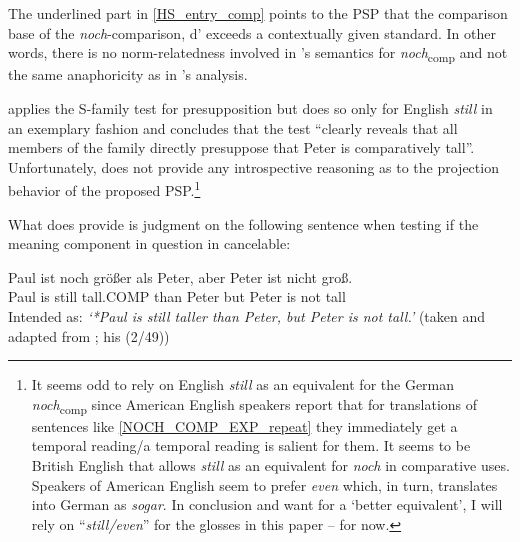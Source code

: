\documentclass[output=paper,
modfonts
]{langscibook}
\begin{document}
The underlined part in \ref{HS_entry_comp} points to the PSP that the comparison base of the \textit{noch}-comparison, d' exceeds a contextually given standard. In other words, there is no norm-relatedness involved in \citeauthor{Hofstetter2013}'s semantics for \textit{noch}\textsubscript{comp} and not the same anaphoricity as in \citeauthor{umbach2009a_comp}'s \citeyearpar{umbach2009a_comp} analysis.

\citeauthor{Hofstetter2013} applies the S-family test \citep{kadmon2001} for presupposition but does so only for English \textit{still} in an exemplary fashion and concludes that the test ``clearly reveals that all members of the family directly presuppose that Peter is comparatively tall''. Unfortunately, \citeauthor{Hofstetter2013} does not provide any introspective reasoning as to the projection behavior of the proposed PSP.\footnote{ It seems odd to rely on English \textit{still} as an equivalent for the German \textit{noch}\textsubscript{comp} since American English speakers report that for translations of sentences like \ref{NOCH_COMP_EXP_repeat} they immediately get a temporal reading/a temporal reading is salient for them. It seems to be British English that allows \textit{still} as an equivalent for \textit{noch} in comparative uses. Speakers of American English seem to prefer \textit{even} which, in turn, translates into German as \textit{sogar}. In conclusion and want for a `better equivalent', I will rely on ``\textit{still\slash even}'' for the glosses in this paper -- for now.}

What \citeauthor{Hofstetter2013} does provide is judgment on the following sentence when testing if the meaning component in question in cancelable:

\ea\gll *Paul ist noch größer als Peter, aber Peter ist nicht groß.\\
       Paul is still tall.COMP than Peter but Peter is not tall\\
\glt   Intended as: \textit{`*Paul is still taller than Peter, but Peter is not tall.'} \flushright\vspace{-9pt} (taken and adapted from \citealt[p.27]{Hofstetter2013}; his (2/49)) \label{hofstetter_ABER_peter_nicht_gross}
\z
\end{document}
